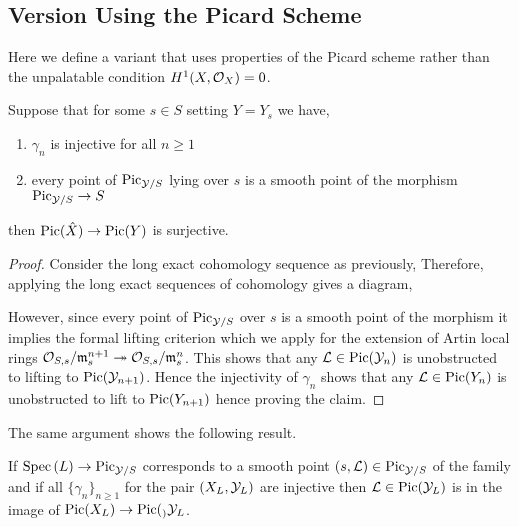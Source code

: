 \documentclass[12pt]{article}
\begin{document}
\subsection{Version Using the Picard Scheme}

Here we define a variant that uses properties of the Picard scheme rather than the unpalatable condition $H^1(X, \mathcal{O}_{X}) = 0$.

\begin{prop} \label{prop:pic_smooth_formal_lifting}
Suppose that for some $s \in S$ setting $Y = Y_s$ we have,
\begin{enumerate}
\item $\gamma_n$ is injective for all $n \ge 1$
\item every point of $\mathrm{Pic}_{\mathcal{Y}/S}$ lying over $s$ is a smooth point of the morphism $\mathrm{Pic}_{\mathcal{Y}/S} \to S$
\end{enumerate}
then $\mathrm{Pic}(\hat{X}) \to \mathrm{Pic}(Y)$ is surjective.
\end{prop}

\begin{proof}
Consider the long exact cohomology sequence as previously,
Therefore, applying the long exact sequences of cohomology gives a diagram,
\begin{center}
\end{center}
However, since every point of $\mathrm{Pic}_{\mathcal{Y}/S}$ over $s$ is a smooth point of the morphism it implies the formal lifting criterion which we apply for the extension of Artin local rings $\mathcal{O}_{S, s} / \mathfrak{m}_s^{n+1} \twoheadrightarrow \mathcal{O}_{S, s} / \mathfrak{m}_s^n$. This shows that any $\mathcal{L} \in \mathrm{Pic}(\mathcal{Y}_{n})$ is unobstructed to lifting to $\mathrm{Pic}(\mathcal{Y}_{n+1})$. Hence the injectivity of $\gamma_n$ shows that any $\mathcal{L} \in \mathrm{Pic}(Y_n)$ is unobstructed to lift to $\mathrm{Pic}(Y_{n+1})$ hence proving the claim.
\end{proof}

The same argument shows the following result. 

\begin{prop}
If $\mathrm{Spec}\left( L \right) \to \mathrm{Pic}_{\mathcal{Y}/S}$ corresponds to a smooth point $(s, \mathcal{L}) \in \mathrm{Pic}_{\mathcal{Y}/S}$ of the family and if all $\{ \gamma_n \}_{n \ge 1}$ for the pair $(X_L, \mathcal{Y}_L)$ are injective then $\mathcal{L} \in \mathrm{Pic}(\mathcal{Y}_L)$ is in the image of $\mathrm{Pic}(X_L) \to \mathrm{Pic}(_){\mathcal{Y}_L}$.
\end{prop}
\end{document}
